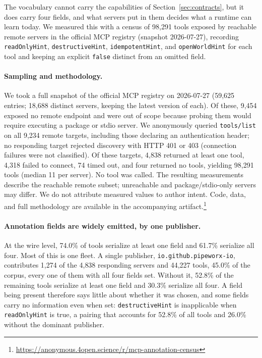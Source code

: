 \documentclass[runningheads]{comsis3}
\begin{document}
The vocabulary cannot carry the capabilities of Section~\ref{sec:contracts},
but it does carry four fields, and what servers put in them decides what
a runtime can learn today. We measured this with a census of 98{,}291
tools exposed by reachable remote servers in the official MCP registry
(snapshot 2026-07-27), recording
\texttt{readOnlyHint}, \texttt{destructiveHint}, \texttt{idempotentHint},
and \texttt{openWorldHint} for each tool and keeping an explicit
\texttt{false} distinct from an omitted field.

\paragraph{Sampling and methodology.}
We took a full snapshot of the official MCP registry on 2026-07-27
(59{,}625 entries; 18{,}688 distinct servers, keeping the latest version of
each). Of these, 9{,}454 exposed no remote endpoint and were out of scope
because probing them would require executing a package or stdio server. We
anonymously queried \texttt{tools/list} on all 9{,}234 remote targets,
including those declaring an authentication header; no responding target
rejected discovery with HTTP 401 or 403 (connection failures were not
classified). Of these targets, 4{,}838 returned
at least one tool, 4{,}318 failed to connect, 74 timed out, and four
returned no tools, yielding 98{,}291 tools (median 11 per server). No
tool was called. The resulting measurements describe the reachable remote
subset; unreachable and package/stdio-only servers may differ. We do not attribute measured values to author intent. Code, data,
and full methodology are available in the accompanying
artifact.\footnote{\url{https://anonymous.4open.science/r/mcp-annotation-census}}

\paragraph{Annotation fields are widely emitted, by one publisher.}
At the wire level, 74.0\% of tools serialize at least one field and 61.7\%
serialize all four. Most of this is one fleet. A single publisher,
\texttt{io.github.pipeworx-io}, contributes 1{,}274 of the 4{,}838
responding servers and 44{,}227 tools, 45.0\% of the corpus, every one of
them with all four fields set. Without it, 52.8\% of the remaining tools
serialize at least one field and 30.3\% serialize all four. A field being
present therefore says little about whether it was chosen, and some fields
carry no information even when set: \texttt{destructiveHint} is
inapplicable when \texttt{readOnlyHint} is true, a pairing that accounts for
52.8\% of all tools and 26.0\% without the dominant publisher.
\end{document}
